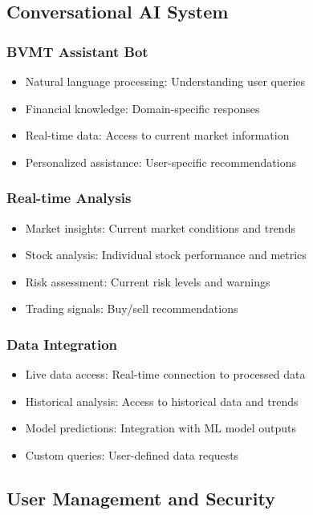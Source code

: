 \subsection{Conversational AI System}
\subsubsection{BVMT Assistant Bot}
\begin{itemize}
    \item Natural language processing: Understanding user queries
    \item Financial knowledge: Domain-specific responses
    \item Real-time data: Access to current market information
    \item Personalized assistance: User-specific recommendations
\end{itemize}

\subsubsection{Real-time Analysis}
\begin{itemize}
    \item Market insights: Current market conditions and trends
    \item Stock analysis: Individual stock performance and metrics
    \item Risk assessment: Current risk levels and warnings
    \item Trading signals: Buy/sell recommendations
\end{itemize}

\subsubsection{Data Integration}
\begin{itemize}
    \item Live data access: Real-time connection to processed data
    \item Historical analysis: Access to historical data and trends
    \item Model predictions: Integration with ML model outputs
    \item Custom queries: User-defined data requests
\end{itemize}

\subsection{User Management and Security}
